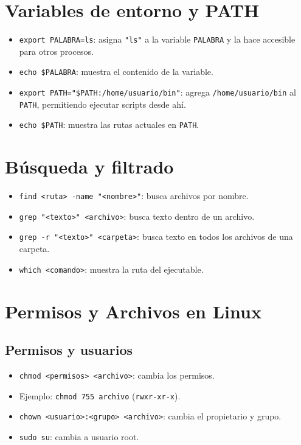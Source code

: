\documentclass{article}
\begin{document}
\section{Variables de entorno y PATH}
\begin{itemize}
    \item \texttt{export PALABRA=ls}: asigna \texttt{"ls"} a la variable \texttt{PALABRA} y la hace accesible para otros procesos.
    \item \texttt{echo \$PALABRA}: muestra el contenido de la variable.
    \item \texttt{export PATH="\$PATH:/home/usuario/bin"}: agrega \texttt{/home/usuario/bin} al \texttt{PATH}, permitiendo ejecutar scripts desde ahí.
    \item \texttt{echo \$PATH}: muestra las rutas actuales en \texttt{PATH}.
\end{itemize}

\section{Búsqueda y filtrado}
\begin{itemize}
    \item \texttt{find <ruta> -name "<nombre>"}: busca archivos por nombre.
    \item \texttt{grep "<texto>" <archivo>}: busca texto dentro de un archivo.
    \item \texttt{grep -r "<texto>" <carpeta>}: busca texto en todos los archivos de una carpeta.
    \item \texttt{which <comando>}: muestra la ruta del ejecutable.
\end{itemize}

\section{Permisos y Archivos en Linux}

\subsection{Permisos y usuarios}
\begin{itemize}
    \item \texttt{chmod <permisos> <archivo>}: cambia los permisos.
    \item Ejemplo: \texttt{chmod 755 archivo} (\texttt{rwxr-xr-x}).
    \item \texttt{chown <usuario>:<grupo> <archivo>}: cambia el propietario y grupo.
    \item \texttt{sudo su}: cambia a usuario root.
\end{itemize}
\end{document}
